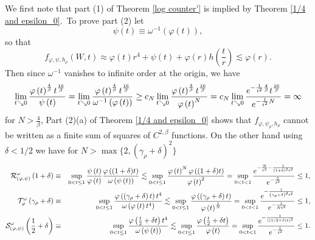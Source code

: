 \documentclass{amsart}
\theoremstyle{plain}
\numberwithin{equation}{section}
\begin{document}
We first note that part (1) of Theorem \ref{log counter'} is implied by
Theorem \ref{1/4 and epsilon_0}.\ To prove part (2) let 
\begin{equation*}
\psi \left( t\right) \equiv \omega ^{-1}\left( \varphi \left( t\right)
\right) ,
\end{equation*}%
so that%
\begin{equation*}
f_{\varphi ,\psi ,h_{\rho }}\left( W,t\right) \approx \varphi \left(
t\right) r^{4}+\psi \left( t\right) +\varphi \left( r\right) h\left( \frac{t%
}{r}\right) \lesssim \varphi \left( r\right) .
\end{equation*}%
Then since $\omega ^{-1}$ vanishes to infinite order at the origin, we have 
\begin{equation*}
\lim_{t\searrow 0}\frac{\varphi \left( t\right) ^{\frac{4}{\beta }}t^{\frac{%
16}{\beta }}}{\psi \left( t\right) }=\lim_{t\searrow 0}\frac{\varphi \left(
t\right) ^{\frac{4}{\beta }}t^{\frac{16}{\beta }}}{\omega ^{-1}\left(
\varphi \left( t\right) \right) }\geq c_{N}\lim_{t\searrow 0}\frac{\varphi
\left( t\right) ^{\frac{4}{\beta }}t^{\frac{16}{\beta }}}{\varphi \left(
t\right) ^{N}}=c_{N}\lim_{t\searrow 0}\frac{e^{-\frac{1}{t^{2}}\frac{4}{%
\beta }}t^{\frac{16}{\beta }}}{e^{-\frac{1}{t^{2}}N}}=\infty
\end{equation*}%
for $N>\frac{4}{\beta }$, Part (2)(a) of Theorem \ref{1/4 and epsilon_0}
shows that $f_{\varphi ,\psi _{\rho },h_{\rho }}$ cannot be written as a
finite sum of squares of $C^{2,\beta }$ functions. On the other hand using $%
\delta <1/2$ we have for $N>\max \{2,\left( \gamma _{\rho }+\delta \right)
^{2}\}$ 
\begin{eqnarray*}
\mathcal{R}_{\left( \varphi ,\psi \right) }^{\omega }\left( 1+\delta \right)
&\equiv &\sup_{0<t\leq 1}\frac{\psi \left( t\right) }{\varphi \left(
t\right) }\frac{\varphi \left( (1+\delta )t\right) }{\omega \left( \psi
\left( t\right) \right) }\lesssim \sup_{0<t\leq 1}\frac{\varphi \left(
t\right) ^{N}\varphi \left( (1+\delta )t\right) }{\varphi \left( t\right)
^{2}}=\sup_{0<t<1}\frac{e^{-\frac{N}{t^{2}}-\frac{1}{(1+\delta )^{2}t^{2}}}}{%
e^{-\frac{2}{t^{2}}}}\leq 1, \\
\mathcal{T}_{\varphi }^{\omega }\left( \gamma _{\rho }+\delta \right)
&\equiv &\sup_{0<t\leq 1}\frac{\varphi \left( \left( \gamma _{\rho }+\delta
\right) t\right) t^{4}}{\omega \left( \varphi \left( t\right) t^{4}\right) }%
\lesssim \sup_{0<t\leq 1}\frac{\varphi \left( \left( \gamma _{\rho }+\delta
\right) t\right) }{\varphi \left( t\right) ^{\frac{1}{N}}}=\sup_{0<t<1}\frac{%
e^{-\frac{1}{\left( \gamma _{\rho }+\delta \right) ^{2}t^{2}}}}{e^{-\frac{1}{%
Nt^{2}}}}\leq 1, \\
\mathcal{S}_{\left( \varphi ,\psi \right) }^{\omega }\left( \frac{1}{2}%
+\delta \right) &\equiv &\sup_{0<t\leq 1}\frac{\varphi \left( \frac{t}{2}%
+\delta t\right) t^{4}}{\omega \left( \psi \left( t\right) \right) }\lesssim
\sup_{0<t\leq 1}\frac{\varphi \left( \frac{t}{2}+\delta t\right) }{\varphi
\left( t\right) }=\sup_{0<t<1}\frac{e^{-\frac{1}{\left( (1/2+\delta
)t\right) ^{2}}}}{e^{-\frac{1}{t^{2}}}}\leq 1.
\end{eqnarray*}
\end{document}

